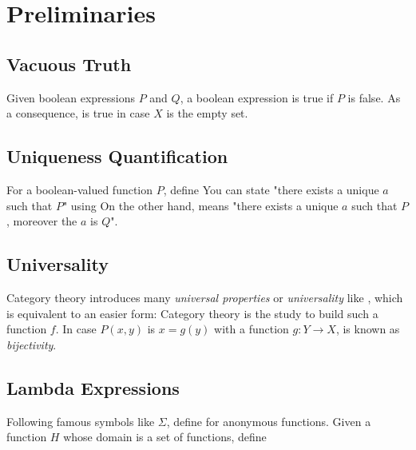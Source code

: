 \section{Preliminaries}

\subsection{Vacuous Truth}

Given boolean expressions $P$ and $Q$, a boolean expression
is true if $P$ is false.
As a consequence,
is true in case $X$ is the empty set.

\subsection{Uniqueness Quantification}

For a boolean-valued function $P$, define
You can state "there exists a unique $a$ such that $P$" using
On the other hand,
means "there exists a unique $a$ such that $P$, moreover the $a$ is $Q$".

\subsection{Universality}

Category theory introduces many \emph{universal properties} or \emph{universality} like 
, which is equivalent to an easier form:
Category theory is the study to build such a function $f$.
\mynewline
In case $P(x,y)$ is $x = g(y)$ with a function $g : Y \to X$,
is known as \emph{bijectivity}.

\subsection{Lambda Expressions}

Following famous symbols like $\Sigma$, define
for anonymous functions.
\mynewline
Given a function $H$ whose domain is a set of functions, define


